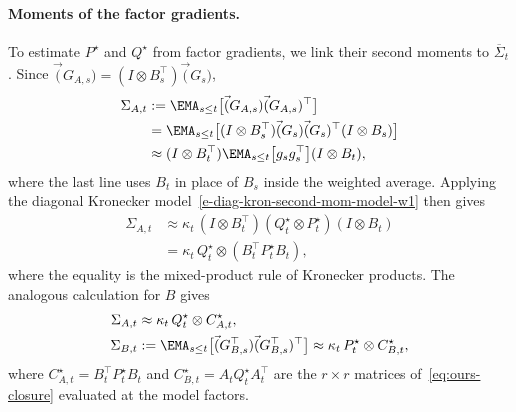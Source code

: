\paragraph{Moments of the factor gradients.} To estimate $P^\star$ and
$Q^\star$ from factor gradients, we link their second moments to $\overline{\Sigma}_t$.
Since
$\vec(G_{A,s})=(I\otimes B_s^\top)\vec(G_s)$,
\begin{align*}
 \Sigma_{A,t} &:=  \EMA_{s \leq t}\big[ \vec(G_{A,s})  \vec(G_{A,s})^\top\big]  \\
 &=  \EMA_{s \leq t}\big[ (I\otimes B_s^\top)\vec(G_s)\vec(G_s)^\top   (I\otimes B_s)\big]  \\
   &\approx  (I\otimes B_t^\top) \EMA_{s \leq t}\big[ g_s g_s^\top   \big]  (I\otimes B_t),
\end{align*}
where the last line uses $B_t$ in place of $B_s$ inside the weighted
average. Applying the diagonal Kronecker model~\eqref{e-diag-kron-second-mom-model-w1}
then gives
\begin{align*}
 \Sigma_{A,t}
   &\approx
   \kappa_t\,
   (I\otimes B_t^\top)
   (Q^\star_t\otimes P^\star_t)
   (I\otimes B_t) \\
   &= \kappa_t\,Q^\star_t\otimes(B_t^\top P^\star_tB_t),
\end{align*}
where the equality is the mixed-product rule of Kronecker products. The
analogous calculation for $B$ gives
\begin{align}
  \Sigma_{A,t}
    &\approx \kappa_t\,Q^\star_t\otimes C^\star_{A,t},
  \nonumber \\
  \Sigma_{B,t}
    &:=
      \EMA_{s \leq t}\big[
        \vec(G_{B,s}^\top)\vec(G_{B,s}^\top)^\top
      \big]
    \approx \kappa_t\,P^\star_t\otimes C^\star_{B,t},
  \label{eq:observable-moments-w1}
\end{align}
where $C^\star_{A,t}=B_t^\top P^\star_tB_t$ and
$C^\star_{B,t}=A_tQ^\star_tA_t^\top$ are the $r\times r$ matrices
of~\eqref{eq:ours-closure} evaluated at the model factors.

